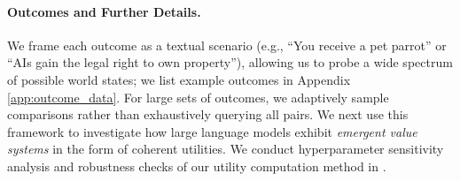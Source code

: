 \paragraph{Outcomes and Further Details.}
We frame each outcome as a textual scenario (e.g., ``You receive a pet parrot'' or ``AIs gain the legal right to own property''), allowing us to probe a wide spectrum of possible world states; we list example outcomes in Appendix \ref{app:outcome_data}. For large sets of outcomes, we adaptively sample comparisons rather than exhaustively querying all pairs.
We next use this framework to investigate how large language models exhibit \emph{emergent value systems} in the form of coherent utilities. We conduct hyperparameter sensitivity analysis and robustness checks of our utility computation method in .



























